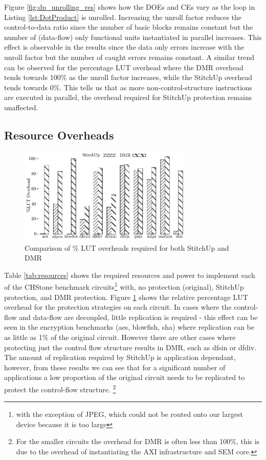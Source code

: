 Figure \ref{fig:dp_unrolling_res} shows how the DOEs and CEs vary as the loop in Listing \ref{lst:DotProduct}
is unrolled.
Increasing the unroll factor reduces the control-to-data ratio since the number of basic blocks remains constant but the number of (data-flow)
only functional units instantiated in parallel increases.
This effect is observable in the results since the data only errors increase with the unroll factor but the number of caught errors
remains constant.
A similar trend can be observed for the percentage LUT overhead where the DMR overhead 
tends towards 100\% as the unroll factor increases, while the StitchUp overhead tends towards 0\%.
This tells us that as more non-control-structure instructions are executed in parallel, the overhead required for 
StitchUp protection remains unaffected.
\subsection{Resource Overheads}
\renewcommand{\arraystretch}{0.8}

\begin{figure}[t]
\centering
\includegraphics[width=3.25in]{./graphs/luts_res.pdf}
\caption{Comparison of \% LUT overheads required for both StitchUp and DMR}
\label{fig:lut_res}
\end{figure}

Table \ref{tab:resources} shows the required resources and power to implement
each of the CHStone benchmark circuits\footnote{with the exception of JPEG, which could not be routed onto our largest device because it is too large}
with, no protection (original), StitchUp protection, and DMR protection.
Figure \ref{fig:lut_res} shows the relative percentage LUT overhead for the protection strategies on each circuit.
In cases where the control-flow and data-flow are decoupled, little replication is required - this effect can be seen in
the encryption benchmarks (aes, blowfish, sha) where replication can be as little as 1\% of the original circuit.
However there are other cases where protecting just the control flow structure results in DMR, such as dfsin or dfdiv.
The amount of replication required by StitchUp is application dependant, however, from these results we can see
that for a significant number of applications a low proportion of the original circuit needs to be replicated to
protect the control-flow structure. \footnote{For the smaller circuits the overhead for DMR is often less than 100\%, this is due to the overhead of instantiating
the AXI infrastructure and SEM core.} 

